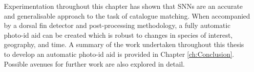 Experimentation throughout this chapter has shown that SNNs are an accurate and generalisable approach to the task of catalogue matching. When accompanied by a dorsal fin detector and post-processing methodology, a fully automatic photo-id aid can be created which is robust to changes in species of interest, geography, and time. A summary of the work undertaken throughout this thesis to develop an automatic photo-id aid is provided in Chapter \ref{ch:Conclusion}. Possible avenues for further work are also explored in detail.
